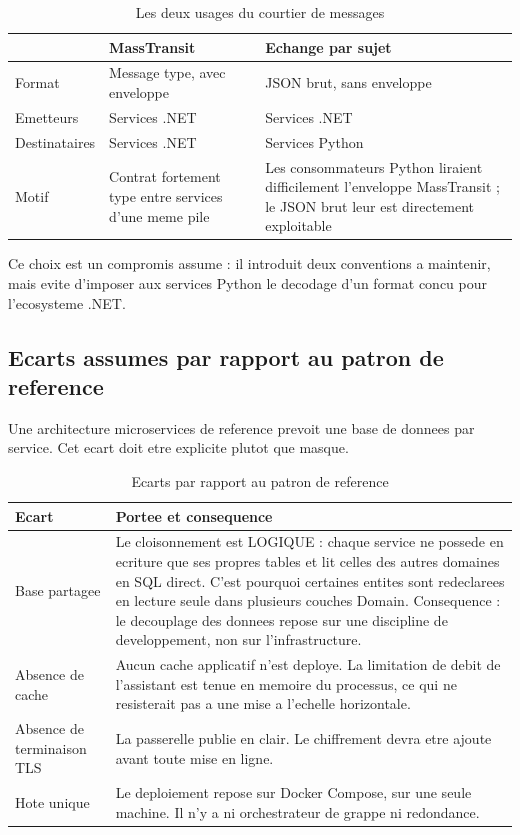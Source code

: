 \begin{table}[H]
\centering
\caption{Les deux usages du courtier de messages}
\label{tab:deux-bus}
\small
\begin{tabularx}{\textwidth}{@{}p{3.2cm}XX@{}}
\toprule
 & \textbf{MassTransit} & \textbf{Echange par sujet} \\ \midrule
Format & Message type, avec enveloppe & JSON brut, sans enveloppe \\
Emetteurs & Services .NET & Services .NET \\
Destinataires & Services .NET & Services Python \\
Motif & Contrat fortement type entre services d'une meme pile &
  Les consommateurs Python liraient difficilement l'enveloppe
  MassTransit ; le JSON brut leur est directement exploitable \\
\bottomrule
\end{tabularx}
\end{table}

Ce choix est un compromis assume : il introduit deux conventions a
maintenir, mais evite d'imposer aux services Python le decodage d'un
format concu pour l'ecosysteme .NET.

\subsection{Ecarts assumes par rapport au patron de reference}
\label{sec:ecarts}

Une architecture microservices de reference prevoit une base de donnees
par service.  Cet ecart doit etre
explicite plutot que masque.

\begin{table}[H]
\centering
\caption{Ecarts par rapport au patron de reference}
\label{tab:ecarts}
\small
\begin{tabularx}{\textwidth}{@{}p{3.6cm}X@{}}
\toprule
\textbf{Ecart} & \textbf{Portee et consequence} \\ \midrule
Base partagee &
  Le cloisonnement est LOGIQUE : chaque service ne possede en ecriture
  que ses propres tables et lit celles des autres domaines en SQL direct.
  C'est pourquoi certaines entites sont redeclarees en lecture seule dans
  plusieurs couches Domain. Consequence : le decouplage des donnees
  repose sur une discipline de developpement, non sur l'infrastructure. \\
Absence de cache &
  Aucun cache applicatif n'est deploye. La limitation de debit de
  l'assistant est tenue en memoire du processus, ce qui ne resisterait
  pas a une mise a l'echelle horizontale. \\
Absence de terminaison TLS &
  La passerelle publie en clair. Le chiffrement devra etre ajoute avant
  toute mise en ligne. \\
Hote unique &
  Le deploiement repose sur Docker Compose, sur une seule machine. Il n'y
  a ni orchestrateur de grappe ni redondance. \\
\bottomrule
\end{tabularx}
\end{table}

